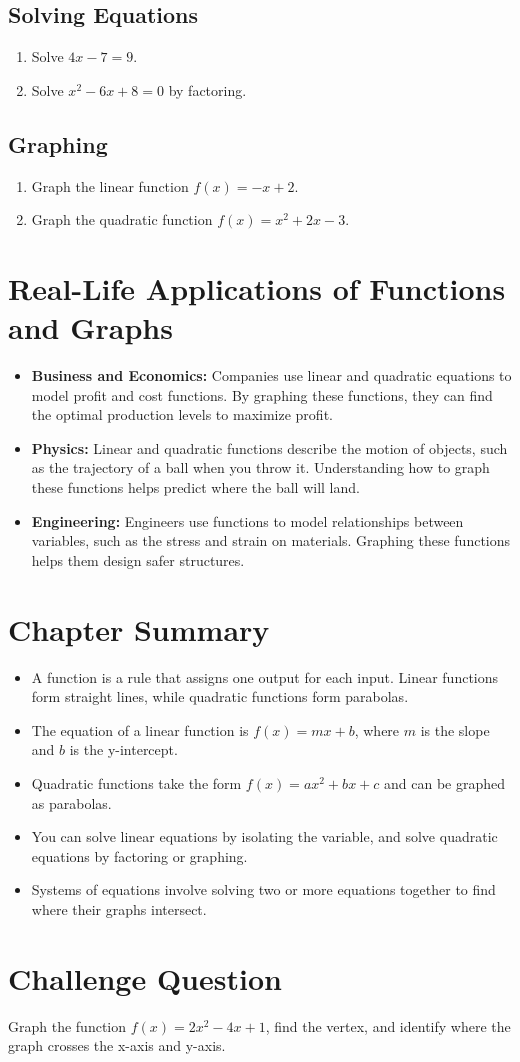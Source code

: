 \subsection*{Solving Equations}
\begin{enumerate}
    \item Solve \( 4x - 7 = 9 \).
    \item Solve \( x^2 - 6x + 8 = 0 \) by factoring.
\end{enumerate}

\subsection*{Graphing}
\begin{enumerate}
    \item Graph the linear function \( f(x) = -x + 2 \).
    \item Graph the quadratic function \( f(x) = x^2 + 2x - 3 \).
\end{enumerate}

\section{Real-Life Applications of Functions and Graphs}
\begin{itemize}
    \item \textbf{Business and Economics:} Companies use linear and quadratic equations to model profit and cost functions. By graphing these functions, they can find the optimal production levels to maximize profit.
    \item \textbf{Physics:} Linear and quadratic functions describe the motion of objects, such as the trajectory of a ball when you throw it. Understanding how to graph these functions helps predict where the ball will land.
    \item \textbf{Engineering:} Engineers use functions to model relationships between variables, such as the stress and strain on materials. Graphing these functions helps them design safer structures.
\end{itemize}

\section{Chapter Summary}
\begin{itemize}
    \item A function is a rule that assigns one output for each input. Linear functions form straight lines, while quadratic functions form parabolas.
    \item The equation of a linear function is \( f(x) = mx + b \), where \( m \) is the slope and \( b \) is the y-intercept.
    \item Quadratic functions take the form \( f(x) = ax^2 + bx + c \) and can be graphed as parabolas.
    \item You can solve linear equations by isolating the variable, and solve quadratic equations by factoring or graphing.
    \item Systems of equations involve solving two or more equations together to find where their graphs intersect.
\end{itemize}

\section*{Challenge Question}
Graph the function \( f(x) = 2x^2 - 4x + 1 \), find the vertex, and identify where the graph crosses the x-axis and y-axis.